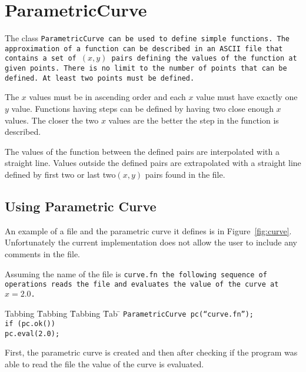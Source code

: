
\section{ParametricCurve}

The class \tt ParametricCurve \rm can be used to define simple
functions.  The approximation of a function
can be described  in an ASCII file that contains a set of $(x,y)$ pairs 
defining the values of the function at given points. 
There is no limit to the number of points
that can be defined. At least two points must be defined.

The $x$ values must be in ascending
order and each $x$ value must have exactly one $y$ value. 
Functions having steps can be defined by having two
close enough $x$ values. The closer the two $x$ values are
the better the step in the function is
described.

The values of the function between the defined pairs are 
interpolated  with a straight line. Values outside the defined
pairs are extrapolated with a straight line defined by
first two or last two$(x,y)$ pairs  found in the file.

\subsection{Using Parametric Curve}
 
An example of a file and the parametric curve it defines 
is in Figure~\ref{fig:curve}. Unfortunately the current implementation
does not allow the user to include any comments in the file. 

Assuming the name of the file is \tt curve.fn \rm the following 
sequence of operations reads the file and evaluates the value of the
curve at $x = 2.0$.
\begin{tabbing}
Tabbing \= Tabbing \= Tabbing \= Tab \= \kill
\>\>\>\tt  ParametricCurve pc(``curve.fn''); \\
\>\>\>\tt  if (pc.ok()) \\
\>\>\>\>\tt pc.eval(2.0);
\end{tabbing}
First, the parametric curve is created and then after checking
if the program was able to read the file the value of the curve
is evaluated.

